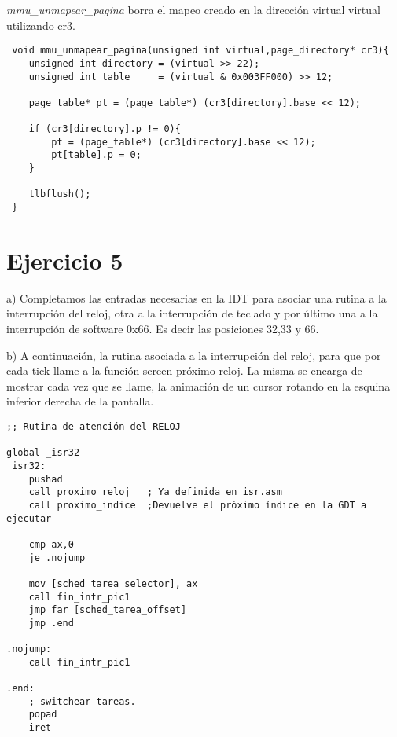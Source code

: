 \documentclass[a4paper]{article}
\begin{document}
\textit{mmu_unmapear_pagina }  borra el mapeo creado en la direcci\'on virtual virtual utilizando cr3. \\


\begin{codesnippet}
\begin{verbatim}
 void mmu_unmapear_pagina(unsigned int virtual,page_directory* cr3){
 	unsigned int directory = (virtual >> 22);
    unsigned int table     = (virtual & 0x003FF000) >> 12;

    page_table* pt = (page_table*) (cr3[directory].base << 12);

    if (cr3[directory].p != 0){
        pt = (page_table*) (cr3[directory].base << 12);
        pt[table].p = 0;
    }

    tlbflush();
 }
\end{verbatim}
\end{codesnippet}

\newpage
\section{Ejercicio 5}

{\large a)} Completamos las entradas necesarias en la IDT para asociar una rutina a la interrupci\'on del
reloj, otra a la interrupci\'on de teclado y por \'ultimo una a la interrupci\'on de software 0x66. Es decir las posiciones 32,33 y 66.


{\large b)} A continuación, la rutina asociada a la interrupci\'on del reloj, para que por cada tick llame a la
funci\'on screen pr\'oximo reloj. La misma se encarga de mostrar cada vez que se llame, la
animaci\'on de un cursor rotando en la esquina inferior derecha de la pantalla. 

\begin{codesnippet}
\begin{verbatim}
;; Rutina de atención del RELOJ

global _isr32
_isr32:
    pushad
    call proximo_reloj 	 ; Ya definida en isr.asm
    call proximo_indice  ;Devuelve el próximo índice en la GDT a ejecutar

    cmp ax,0
    je .nojump

    mov [sched_tarea_selector], ax
    call fin_intr_pic1
    jmp far [sched_tarea_offset]
    jmp .end

.nojump:
    call fin_intr_pic1

.end:
    ; switchear tareas.
    popad
    iret
\end{verbatim}
\end{codesnippet}
\end{document}
